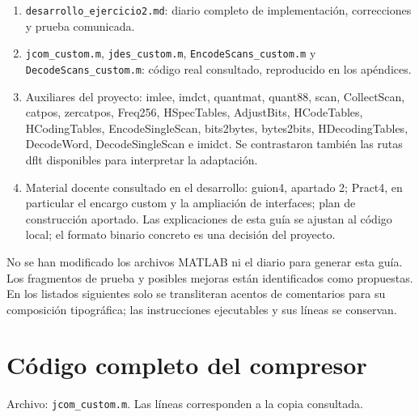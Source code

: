 \documentclass[11pt,a4paper,oneside]{report}
\begin{document}
\begin{enumerate}
\item \texttt{desarrollo\_ejercicio2.md}: diario completo de implementación,
correcciones y prueba comunicada.
\item \texttt{jcom\_custom.m}, \texttt{jdes\_custom.m},
\texttt{EncodeScans\_custom.m} y \texttt{DecodeScans\_custom.m}:
código real consultado, reproducido en los apéndices.
\item Auxiliares del proyecto: imlee, imdct, quantmat, quant88, scan,
CollectScan, catpos, zercatpos, Freq256, HSpecTables, AdjustBits,
HCodeTables, HCodingTables, EncodeSingleScan, bits2bytes, bytes2bits,
HDecodingTables, DecodeWord, DecodeSingleScan e imidct. Se contrastaron
también las rutas dflt disponibles para interpretar la adaptación.
\item Material docente consultado en el desarrollo: guion4, apartado 2;
Pract4, en particular el encargo custom y la ampliación de interfaces;
plan de construcción aportado. Las explicaciones de esta guía se ajustan
al código local; el formato binario concreto es una decisión del proyecto.
\end{enumerate}
No se han modificado los archivos MATLAB ni el diario para generar esta guía.
Los fragmentos de prueba y posibles mejoras están identificados como propuestas.
En los listados siguientes solo se transliteran acentos de comentarios para
su composición tipográfica; las instrucciones ejecutables y sus líneas se conservan.


\appendix
\chapter{Código completo del compresor}\label{src:jcom_custom.m}

Archivo: \texttt{jcom\_custom.m}. Las líneas corresponden a la copia consultada.
\end{document}
